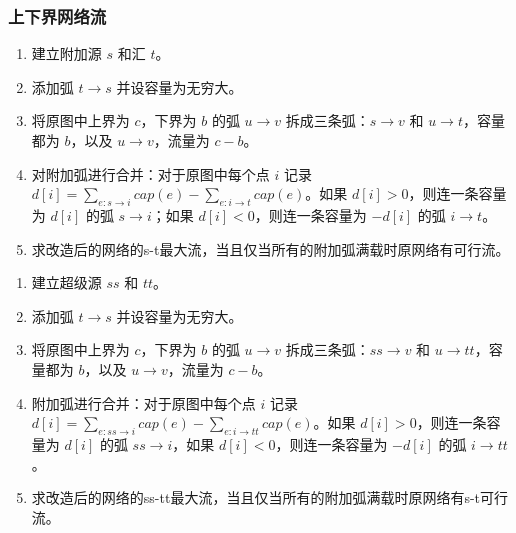 \subsubsection{上下界网络流}


\begin{enumerate}

\item 建立附加源 $s$ 和汇 $t$。

\item 添加弧 $t\to s$ 并设容量为无穷大。

\item 将原图中上界为 $c$，下界为 $b$ 的弧 $u\to v$ 拆成三条弧：$s\to v$ 和 $u \to t$，容量都为 $b$，以及 $u\to v$，流量为 $c-b$。

\item 对附加弧进行合并：对于原图中每个点 $i$ 记录 $d[i]=\sum\limits_{e:s\to i} cap(e) - \sum\limits_{e:i\to t} cap(e)$。如果 $d[i]>0$，则连一条容量为 $d[i]$ 的弧 $s\to i$；如果 $d[i]<0$，则连一条容量为 $-d[i]$ 的弧 $i\to t$。

\item 求改造后的网络的s-t最大流，当且仅当所有的附加弧满载时原网络有可行流。

\end{enumerate}


\begin{enumerate}

\item 建立超级源 $ss$ 和 $tt$。

\item 添加弧 $t\to s$ 并设容量为无穷大。

\item 将原图中上界为 $c$，下界为 $b$ 的弧 $u\to v$ 拆成三条弧：$ss\to v$ 和 $u \to tt$，容量都为 $b$，以及 $u\to v$，流量为 $c-b$。

\item 附加弧进行合并：对于原图中每个点 $i$ 记录 $d[i]=\sum\limits_{e:ss\to i} cap(e) - \sum\limits_{e:i\to tt} cap(e)$。如果 $d[i]>0$，则连一条容量为 $d[i]$ 的弧 $ss\to i$，如果 $d[i]<0$，则连一条容量为 $-d[i]$ 的弧 $i\to tt$。

\item 求改造后的网络的ss-tt最大流，当且仅当所有的附加弧满载时原网络有s-t可行流。

\end{enumerate}

